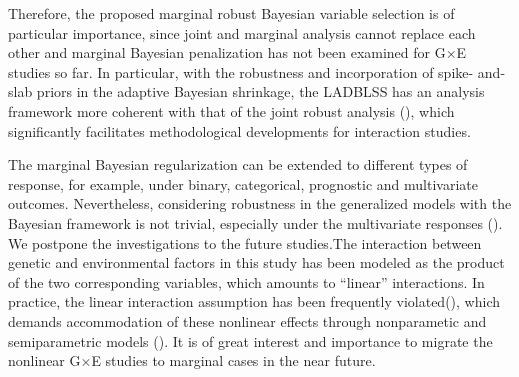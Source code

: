 \documentclass[12pt]{article}
\begin{document}
Therefore, the proposed marginal robust Bayesian variable selection is of particular importance, since joint and marginal analysis cannot replace each other and marginal Bayesian penalization has not been examined for G$\times$E studies so far. In particular, with the robustness and incorporation of spike- and-slab priors in the adaptive Bayesian shrinkage, the LADBLSS has an analysis framework more coherent with that of the joint robust analysis (\cite{RZLM}), which significantly facilitates methodological developments for interaction studies. 

The marginal Bayesian regularization can be extended to different types of response, for example, under binary, categorical, prognostic and multivariate outcomes. Nevertheless, considering robustness in the generalized models with the Bayesian framework is not trivial, especially under the multivariate responses (\cite{WCM, ZRLJ}). We postpone the investigations to the future studies.The interaction between genetic and environmental factors in this study has been modeled as the product of the two corresponding variables, which amounts to “linear” interactions. In practice, the linear interaction assumption has been frequently violated(\cite{MAYR, WUCY,ZZC}), which demands accommodation of these nonlinear effects through nonparametic and semiparametric models (\cite{LWL, RZL, WZCY, WSCM}). It is of great interest and importance to migrate the nonlinear G$\times$E studies to marginal cases in the near future. 
\end{document}
